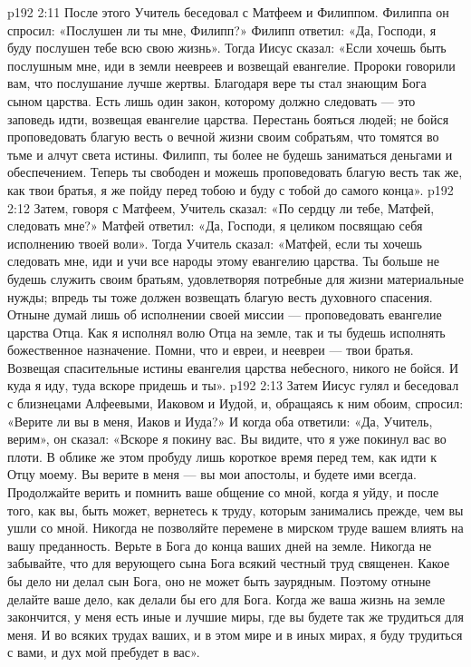 \vs p192 2:11 \pc После этого Учитель беседовал с Матфеем и Филиппом. Филиппа он спросил: «Послушен ли ты мне, Филипп?» Филипп ответил: «Да, Господи, я буду послушен тебе всю свою жизнь». Тогда Иисус сказал: «Если хочешь быть послушным мне, иди в земли неевреев и возвещай евангелие. Пророки говорили вам, что послушание лучше жертвы. Благодаря вере ты стал знающим Бога сыном царства. Есть лишь один закон, которому должно следовать --- это заповедь идти, возвещая евангелие царства. Перестань бояться людей; не бойся проповедовать благую весть о вечной жизни своим собратьям, что томятся во тьме и алчут света истины. Филипп, ты более не будешь заниматься деньгами и обеспечением. Теперь ты свободен и можешь проповедовать благую весть так же, как твои братья, я же пойду перед тобою и буду с тобой до самого конца».
\vs p192 2:12 Затем, говоря с Матфеем, Учитель сказал: «По сердцу ли тебе, Матфей, следовать мне?» Матфей ответил: «Да, Господи, я целиком посвящаю себя исполнению твоей воли». Тогда Учитель сказал: «Матфей, если ты хочешь следовать мне, иди и учи все народы этому евангелию царства. Ты больше не будешь служить своим братьям, удовлетворяя потребные для жизни материальные нужды; впредь ты тоже должен возвещать благую весть духовного спасения. Отныне думай лишь об исполнении своей миссии --- проповедовать евангелие царства Отца. Как я исполнял волю Отца на земле, так и ты будешь исполнять божественное назначение. Помни, что и евреи, и неевреи --- твои братья. Возвещая спасительные истины евангелия царства небесного, никого не бойся. И куда я иду, туда вскоре придешь и ты».
\vs p192 2:13 \pc Затем Иисус гулял и беседовал с близнецами Алфеевыми, Иаковом и Иудой, и, обращаясь к ним обоим, спросил: «Верите ли вы в меня, Иаков и Иуда?» И когда оба ответили: «Да, Учитель, верим», он сказал: «Вскоре я покину вас. Вы видите, что я уже покинул вас во плоти. В облике же этом пробуду лишь короткое время перед тем, как идти к Отцу моему. Вы верите в меня --- вы мои апостолы, и будете ими всегда. Продолжайте верить и помнить ваше общение со мной, когда я уйду, и после того, как вы, быть может, вернетесь к труду, которым занимались прежде, чем вы ушли со мной. Никогда не позволяйте перемене в мирском труде вашем влиять на вашу преданность. Верьте в Бога до конца ваших дней на земле. Никогда не забывайте, что для верующего сына Бога всякий честный труд священен. Какое бы дело ни делал сын Бога, оно не может быть заурядным. Поэтому отныне делайте ваше дело, как делали бы его для Бога. Когда же ваша жизнь на земле закончится, у меня есть иные и лучшие миры, где вы будете так же трудиться для меня. И во всяких трудах ваших, и в этом мире и в иных мирах, я буду трудиться с вами, и дух мой пребудет в вас».
